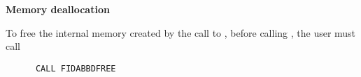 \begin{Steps}
\item {\bf Memory deallocation}

  To free the internal memory created by the call to , before
  calling , the user must call
\begin{verbatim}
      CALL FIDABBDFREE
\end{verbatim}

\end{Steps}
